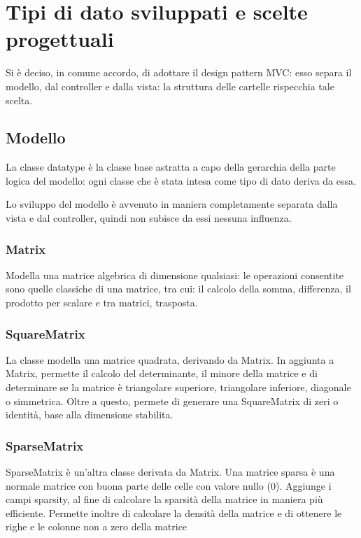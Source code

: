 \section{Tipi di dato sviluppati e scelte progettuali}
Si è deciso, in comune accordo, di adottare il design pattern MVC: esso separa il modello,
dal controller e dalla vista: la struttura delle cartelle rispecchia tale scelta.

\subsection{Modello}
La classe datatype è la classe base astratta a capo della gerarchia della parte logica del modello:
ogni classe che è stata intesa come tipo di dato deriva da essa.

Lo sviluppo del modello è avvenuto in maniera completamente separata dalla vista e dal controller,
quindi non subisce da essi nessuna influenza.

\subsubsection{Matrix}
Modella una matrice algebrica di dimensione qualsiasi: le operazioni consentite sono quelle classiche
di una matrice, tra cui: il calcolo della somma, differenza, il prodotto per scalare e tra matrici, trasposta.

\subsubsection{SquareMatrix}
La classe modella una matrice quadrata, derivando da Matrix.
In aggiunta a Matrix, permette il calcolo del determinante, il minore della matrice e di determinare se la matrice è triangolare superiore,
triangolare inferiore, diagonale o simmetrica.
Oltre a questo, permete di generare una SquareMatrix di zeri o identità, base alla dimensione stabilita.

\subsubsection{SparseMatrix}
SparseMatrix è un'altra classe derivata da Matrix. Una matrice sparsa è una normale matrice con buona parte delle 
celle con valore nullo (0). Aggiunge i campi sparsity, al fine di calcolare la sparsità della matrice
in maniera più efficiente.
Permette inoltre di calcolare la densità della matrice e di ottenere le righe e le colonne non a zero della matrice

